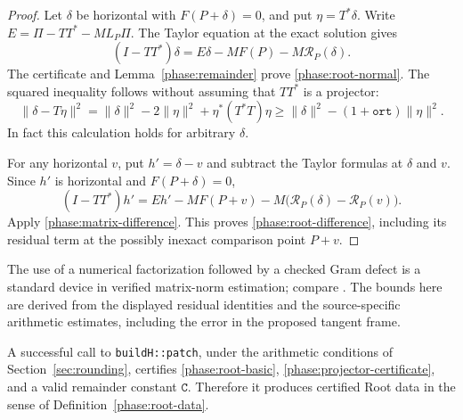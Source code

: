 \begin{proof}
Let \(\delta\) be horizontal with \(F(P+\delta)=0\), and put
\(\eta=T^*\delta\).  Write \(E=\Pi-TT^*-ML_P\Pi\).  The Taylor
equation at the exact solution gives
\[
 (I-TT^*)\delta
  =E\delta-MF(P)-M\mathcal R_P(\delta).
\]
The certificate and Lemma~\ref{phase:remainder} prove
\eqref{phase:root-normal}.  The squared inequality follows without
assuming that \(TT^*\) is a projector:
\[
 \|\delta-T\eta\|^2
   =\|\delta\|^2-2\|\eta\|^2+\eta^*(T^*T)\eta
   \geq\|\delta\|^2-(1+\mathtt{ort})\|\eta\|^2.
\]
In fact this calculation holds for arbitrary \(\delta\).

For any horizontal \(v\), put \(h'=\delta-v\) and subtract the Taylor
formulas at \(\delta\) and \(v\).  Since \(h'\) is horizontal and
\(F(P+\delta)=0\),
\[
 (I-TT^*)h'
   =Eh'-MF(P+v)-M\bigl(\mathcal R_P(\delta)-\mathcal R_P(v)\bigr).
\]
Apply \eqref{phase:matrix-difference}.  This proves
\eqref{phase:root-difference}, including its residual term at the
possibly inexact comparison point \(P+v\).
\end{proof}

The use of a numerical factorization followed by a checked Gram defect
is a standard device in verified matrix-norm estimation; compare
\cite{Rump2011VerifiedSingularValues}. The bounds here are derived from
the displayed residual identities and the source-specific arithmetic
estimates, including the error in the proposed tangent frame.

\begin{proposition}
\label{phase:stored-root-certificate}
A successful call to \texttt{buildH::patch}, under the arithmetic
conditions of Section~\ref{sec:rounding}, certifies
\eqref{phase:root-basic}, \eqref{phase:projector-certificate}, and a valid
remainder constant \(\mathtt C\).  Therefore it produces certified Root
data in the sense of Definition~\ref{phase:root-data}.
\end{proposition}

